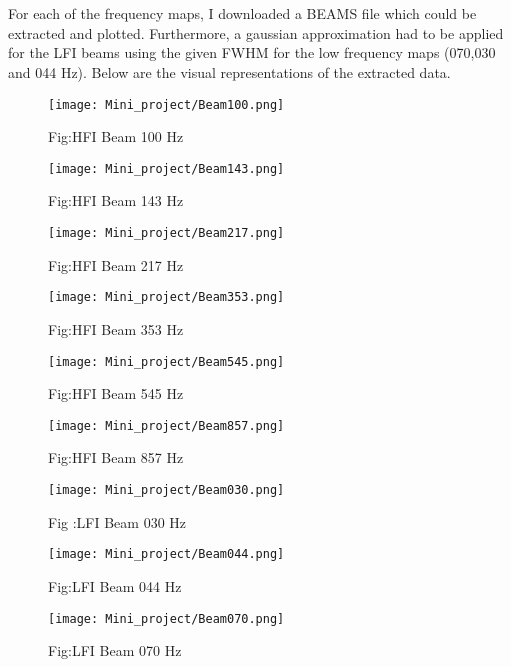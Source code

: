\documentclass{article}
\begin{document}
  
\newpage

\section{}

For each of the frequency maps, I downloaded a BEAMS file which could be extracted and plotted. Furthermore, a gaussian approximation had to be applied for the LFI beams using the given FWHM for the low frequency maps (070,030 and 044 Hz). Below are the visual representations of the extracted data.

\newpage

\begin{figure}
    \centering
    \texttt{[image: Mini\_project/Beam100.png]}
     \caption{Fig:HFI Beam 100 Hz }
\end{figure}

\begin{figure}
    \centering
    \texttt{[image: Mini\_project/Beam143.png]}
     \caption{Fig:HFI Beam 143 Hz }
\end{figure}

\newpage

\begin{figure}
    \centering
    \texttt{[image: Mini\_project/Beam217.png]}
     \caption{Fig:HFI Beam 217 Hz }
\end{figure}

\begin{figure}
    \centering
    \texttt{[image: Mini\_project/Beam353.png]}
     \caption{Fig:HFI Beam 353 Hz }
\end{figure}

\newpage

\begin{figure}
    \centering
    \texttt{[image: Mini\_project/Beam545.png]}
    \caption{Fig:HFI Beam 545 Hz }
\end{figure}

\begin{figure}
    \centering
    \texttt{[image: Mini\_project/Beam857.png]}
    \caption{Fig:HFI Beam 857 Hz}
\end{figure}

\newpage

\begin{figure}
    \centering
    \texttt{[image: Mini\_project/Beam030.png]}
    \caption{Fig :LFI Beam 030 Hz }
\end{figure}

\begin{figure}
    \centering
    \texttt{[image: Mini\_project/Beam044.png]}
    \caption{Fig:LFI Beam 044 Hz }
\end{figure}


\begin{figure}
    \centering
    \texttt{[image: Mini\_project/Beam070.png]}
    \caption{Fig:LFI Beam 070 Hz }
\end{figure}


    




  
\end{document}
